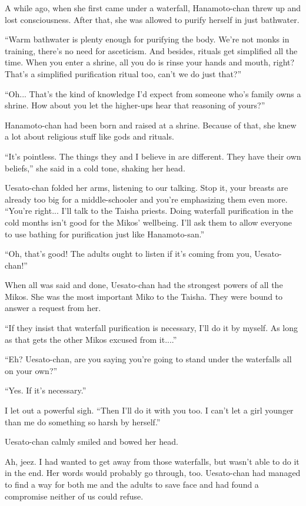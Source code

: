 A while ago, when she first came under a waterfall, Hanamoto-chan threw up and lost consciousness. After that, she was allowed to purify herself in just bathwater.

``Warm bathwater is plenty enough for purifying the body. We're not monks in training, there's no need for asceticism. And besides, rituals get simplified all the time. When you enter a shrine, all you do is rinse your hands and mouth, right? That's a simplified purification ritual too, can't we do just that?''

``Oh... That's the kind of knowledge I'd expect from someone who's family owns a shrine. How about you let the higher-ups hear that reasoning of yours?''

Hanamoto-chan had been born and raised at a shrine. Because of that, she knew a lot about religious stuff like gods and rituals.

``It's pointless. The things they and I believe in are different. They have their own beliefs,'' she said in a cold tone, shaking her head.

Uesato-chan folded her arms, listening to our talking. Stop it, your breasts are already too big for a middle-schooler and you're emphasizing them even more.  ``You're right... I'll talk to the Taisha priests. Doing waterfall purification in the cold months isn't good for the Mikos' wellbeing. I'll ask them to allow everyone to use bathing for purification just like Hanamoto-san.''

``Oh, that's good! The adults ought to listen if it's coming from you, Uesato-chan!''

When all was said and done, Uesato-chan had the strongest powers of all the Mikos. She was the most important Miko to the Taisha. They were bound to answer a request from her.

``If they insist that waterfall purification is necessary, I'll do it by myself. As long as that gets the other Mikos excused from it....''

``Eh? Uesato-chan, are you saying you're going to stand under the waterfalls all on your own?''

``Yes. If it's necessary.''

I let out a powerful sigh.  ``Then I'll do it with you too. I can't let a girl younger than me do something so harsh by herself.''

Uesato-chan calmly smiled and bowed her head.

Ah, jeez. I had wanted to get away from those waterfalls, but wasn't able to do it in the end. Her words would probably go through, too. Uesato-chan had managed to find a way for both me and the adults to save face and had found a compromise neither of us could refuse.

